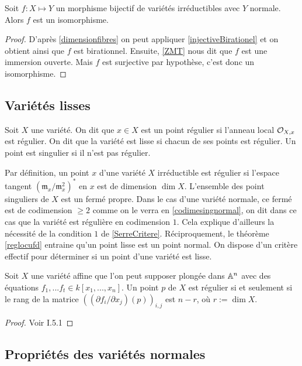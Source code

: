 \begin{thm}\label{ZMTCor}
Soit $f:X \mapsto Y$ un morphisme bijectif de variétés irréductibles avec $Y$ normale. Alors $f$ est un isomorphisme.
\end{thm}
\begin{proof}
D'après \ref{dimensionfibres} on peut appliquer \ref{injectiveBirationel} et on obtient ainsi que $f$ est birationnel. Ensuite, \ref{ZMT} nous dit que $f$ est une immersion ouverte. Mais $f$ est surjective par hypothèse, c'est donc un isomorphisme.
\end{proof}

\subsection{Variétés lisses}

\begin{defn}
Soit $X$ une variété. On dit que $x\in X$ est un point régulier si l'anneau local $\mathcal{O}_{X,x}$ est régulier. On dit que la variété est lisse si chacun de ses points est régulier. Un point est singulier si il n'est pas régulier.
\end{defn}

Par définition, un point $x$ d'une variété $X$ irréductible est régulier si l'espace tangent $(\mathfrak{m}_x/\mathfrak{m}_x^2)^*$ en $x$ est de dimension $\dim X$. L'ensemble des point singuliers de $X$ est un fermé propre. Dans le cas d'une variété normale, ce fermé est de codimension $\geq 2$ comme on le verra en \ref{codimesingnormal}, on dit dans ce cas que la variété est régulière en codimension $1$. Cela explique d'ailleurs la nécessité de la condition $1$ de \ref{SerreCritere}. Réciproquement, le théorème \ref{reglocufd} entraine qu'un point lisse est un point normal. On dispose d'un critère effectif pour déterminer si un point d'une variété est lisse.

\begin{prop}\label{CritereReg}
Soit $X$ une variété affine que l'on peut supposer plongée dans $\mathbb{A}^n$ avec des équations $f_1,...f_t\in k[x_1,...,x_n]$. Un point $p$ de $X$ est régulier si et seulement si le rang de la matrice $((\partial f_i/\partial x_j)(p))_{i,j}$ est $n-r$, où $r:=\dim X$.
\end{prop}
\begin{proof}
Voir \cite{Hartshorne} I.5.1
\end{proof}


\subsection{Propriétés des variétés normales}

